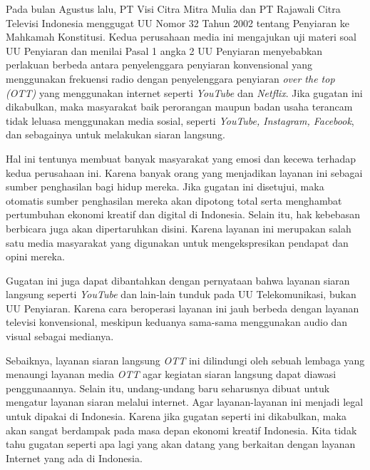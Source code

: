 \documentclass[
]{article}
\author{}
\date{}
\begin{document}
Pada bulan Agustus lalu, PT Visi Citra Mitra Mulia dan PT Rajawali Citra
Televisi Indonesia menggugat UU Nomor 32 Tahun 2002 tentang Penyiaran ke
Mahkamah Konstitusi. Kedua perusahaan media ini mengajukan uji materi
soal UU Penyiaran dan menilai Pasal 1 angka 2 UU Penyiaran menyebabkan
perlakuan berbeda antara penyelenggara penyiaran konvensional yang
menggunakan frekuensi radio dengan penyelenggara penyiaran \emph{over
the top (OTT)} yang menggunakan internet seperti \emph{YouTube} dan
\emph{Netflix}. Jika gugatan ini dikabulkan, maka masyarakat baik
perorangan maupun badan usaha terancam tidak leluasa menggunakan media
sosial, seperti \emph{YouTube, Instagram, Facebook}, dan sebagainya
untuk melakukan siaran langsung.

Hal ini tentunya membuat banyak masyarakat yang emosi dan kecewa
terhadap kedua perusahaan ini. Karena banyak orang yang menjadikan
layanan ini sebagai sumber penghasilan bagi hidup mereka. Jika gugatan
ini disetujui, maka otomatis sumber penghasilan mereka akan dipotong
total serta menghambat pertumbuhan ekonomi kreatif dan digital di
Indonesia. Selain itu, hak kebebasan berbicara juga akan dipertaruhkan
disini. Karena layanan ini merupakan salah satu media masyarakat yang
digunakan untuk mengekspresikan pendapat dan opini mereka.

Gugatan ini juga dapat dibantahkan dengan pernyataan bahwa layanan
siaran langsung seperti \emph{YouTube} dan lain-lain tunduk pada UU
Telekomunikasi, bukan UU Penyiaran. Karena cara beroperasi layanan ini
jauh berbeda dengan layanan televisi konvensional, meskipun keduanya
sama-sama menggunakan audio dan visual sebagai medianya.

Sebaiknya, layanan siaran langsung \emph{OTT} ini dilindungi oleh sebuah
lembaga yang menaungi layanan media \emph{OTT} agar kegiatan siaran
langsung dapat diawasi penggunaannya. Selain itu, undang-undang baru
seharusnya dibuat untuk mengatur layanan siaran melalui internet. Agar
layanan-layanan ini menjadi legal untuk dipakai di Indonesia. Karena
jika gugatan seperti ini dikabulkan, maka akan sangat berdampak pada
masa depan ekonomi kreatif Indonesia. Kita tidak tahu gugatan seperti
apa lagi yang akan datang yang berkaitan dengan layanan Internet yang
ada di Indonesia.
\end{document}
